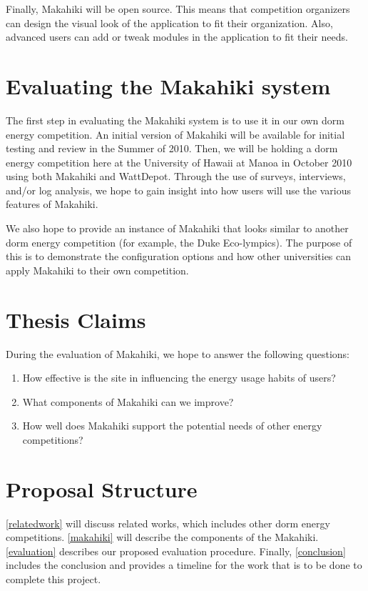 Finally, Makahiki will be open source.  This means that competition organizers can design the visual look of the application to fit their organization.  Also, advanced users can add or tweak modules in the application to fit their needs.

\section{Evaluating the Makahiki system}

The first step in evaluating the Makahiki system is to use it in our own dorm energy competition.  An initial version of Makahiki will be available for initial testing and review in the Summer of 2010.  Then, we will be holding a dorm energy competition here at the University of Hawaii at Manoa in October 2010 using both Makahiki and WattDepot.  Through the use of surveys, interviews, and/or log analysis, we hope to gain insight into how users will use the various features of Makahiki.

We also hope to provide an instance of Makahiki that looks similar to another dorm energy competition (for example, the Duke Eco-lympics).  The purpose of this is to demonstrate the configuration options and how other universities can apply Makahiki to their own competition.

\section{Thesis Claims}

During the evaluation of Makahiki, we hope to answer the following questions:

\begin{enumerate}
	\item How effective is the site in influencing the energy usage habits of users?
	\item What components of Makahiki can we improve?
	\item How well does Makahiki support the potential needs of other energy competitions?
\end{enumerate}

\section{Proposal Structure}

\autoref{relatedwork} will discuss related works, which includes other dorm energy competitions.  \autoref{makahiki} will describe the components of the Makahiki.  \autoref{evaluation} describes our proposed evaluation procedure.  Finally, \autoref{conclusion} includes the conclusion and provides a timeline for the work that is to be done to complete this project.


